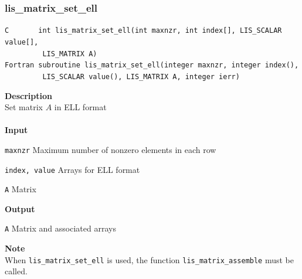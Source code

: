 \documentclass[a4paper]{article}
\newcommand{\namelistlabel}[1]{\mbox{#1}\hfill}
\newenvironment{namelist}[1]{%
 \begin{list}{}
  {\let\makelabel\namelistlabel
  \settowidth{\labelwidth}{#1}
  \setlength{\leftmargin}{1.1\labelwidth}}
}{%
\end{list}}
\begin{document}
  \subsubsection{lis\_matrix\_set\_ell}
\begin{screen}
\verb|C       int lis_matrix_set_ell(int maxnzr, int index[], LIS_SCALAR value[],|\\
\verb|         LIS_MATRIX A)|\\
\verb|Fortran subroutine lis_matrix_set_ell(integer maxnzr, integer index(),|\\
\verb|         LIS_SCALAR value(), LIS_MATRIX A, integer ierr)|
\end{screen}
{\bf Description}\\
\indent
Set matrix $A$ in ELL format
\\ \\
\noindent
{\bf Input}
\begin{namelist}{XXXXXXXXXXXXXXXXXXXX}
\item[\tt maxnzr] Maximum number of nonzero elements in each row
\item[\tt index, value] Arrays for ELL format
\item[\tt A] Matrix
\end{namelist}
{\bf Output}
\begin{namelist}{XXXXXXXXXXXXXXXXXXXX}
\item[\tt A] Matrix and associated arrays
\end{namelist}
\noindent
{\bf Note}\\
\indent
When \verb|lis_matrix_set_ell| is used, 
the function \verb|lis_matrix_assemble| must be called. 

\end{document}

